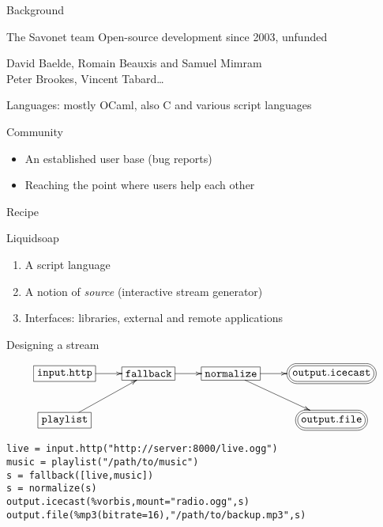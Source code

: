\documentclass{beamer}
\renewcommand{\emph}[1]{\alert{#1}}
\begin{document}

\begin{frame}{Background}

\begin{block}{The Savonet team}
Open-source development since \emph{2003}, unfunded
\begin{center}
David Baelde, Romain Beauxis and Samuel Mimram \\
Peter Brookes, Vincent Tabard\ldots
\end{center}
Languages: mostly \emph{OCaml}, also C and various script languages
\end{block}

\vfill

\begin{block}{Community}
\begin{itemize}
\item An established user base (bug reports)
\item Reaching the point where users help each other
\end{itemize}
\end{block}

\end{frame}

\begin{frame}{Recipe}

\begin{block}{Liquidsoap}
\begin{enumerate}
\item<1-> A script language
\item<2-> A notion of {\em source} (interactive stream generator)
\item<3-> Interfaces: libraries, external and remote applications
\end{enumerate}
\end{block}

\end{frame}


\begin{frame}[fragile]{Designing a stream}

\[
\xymatrix{
  *+[F]{\mathtt{input.http}}\ar[r]&*+[F]{\mathtt{fallback}}\ar[r]&
  *+[F]{\mathtt{normalize}}\ar[r]\ar[dr]&
  *+<10pt>[F=:<30pt>]{\mathtt{output.icecast}}\\
  *+[F]{\mathtt{playlist}}\ar[ur]& & & *+<10pt>[F=:<30pt>]{\mathtt{output.file}}\\
}
\]
\vfill
\pause

\begin{lstlisting}
live = input.http("http://server:8000/live.ogg")
music = playlist("/path/to/music")
s = fallback([live,music])
s = normalize(s)
output.icecast(%vorbis,mount="radio.ogg",s)
output.file(%mp3(bitrate=16),"/path/to/backup.mp3",s)
\end{lstlisting}

\end{frame}
\end{document}
